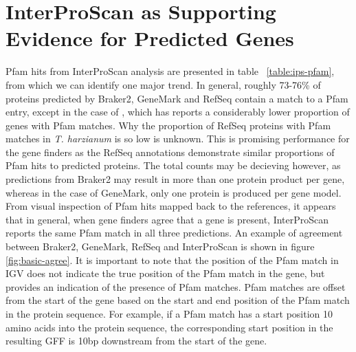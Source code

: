 \section{InterProScan as Supporting Evidence for Predicted Genes}

Pfam hits from InterProScan analysis are presented in table
~\ref{table:ips-pfam}, from which we can identify one major trend. In
general, roughly 73-76\% of proteins predicted by Braker2, GeneMark
and RefSeq contain a match to a Pfam entry, except in the case of
, which has reports a considerably lower
proportion of genes with Pfam matches. Why the proportion of RefSeq
proteins with Pfam matches in \textit{T. harzianum} is so low is
unknown. This is promising performance for the gene finders as the
RefSeq annotations demonstrate similar proportions of Pfam hits to
predicted proteins. The total counts may be decieving however, as
predictions from Braker2 may result in more than one protein product
per gene, whereas in the case of GeneMark, only one protein is
produced per gene model. From visual inspection of Pfam hits mapped
back to the references, it appears that in general, when gene finders
agree that a gene is present, InterProScan reports the same Pfam match
in all three predictions. An example of agreement between Braker2,
GeneMark, RefSeq and InterProScan is shown in figure
\ref{fig:basic-agree}. It is important to note that the position of
the Pfam match in IGV does not indicate the true position of the Pfam
match in the gene, but provides an indication of the presence of Pfam
matches. Pfam matches are offset from the start of the gene based on
the start and end position of the Pfam match in the protein
sequence. For example, if a Pfam match has a start position 10 amino
acids into the protein sequence, the corresponding start position in
the resulting GFF is 10bp downstream from the start of the gene. 

